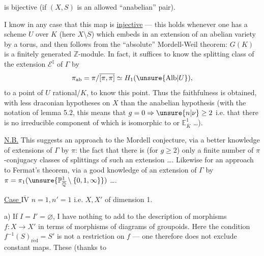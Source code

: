 

is bijective (if $(X,S)$ is an allowed ``anabelian'' pair).

I know in any case that this map is \uline{injective} --- this holds whenever one has a scheme $U$ over $K$ (here $X\setminus S$) which embeds in an  extension of an abelian variety by a torus, and then follows from the ``absolute'' Mordell-Weil theorem: $G(K)$ is a finitely generated $\mathbb Z$-module.
In fact, it suffices to know the splitting class of the extension $\mathcal E^{\natural}$ of $\Gamma$ by
\[
 \pi_{\mathrm{ab}}=\pi/\overline{[\pi,\pi]}\simeq H_1(\unsure{\mathrm{Alb}|U}),
\]
  to a point of $U$ rational/$K$, to know this point. Thus the  faithfulness is obtained, with less draconian hypotheses on $X$ than the anabelian hypothesis (with the notation of lemma 5.2, this means that $g=0\Rightarrow\unsure{n|\nu}\ge2$ i.e. that there is no irreducible component of  which is isomorphic to  or $\mathbb E^1_{\overline K}$ \ldots).



\uline{N.B.} This suggests an approach to the Mordell conjecture, via a better knowledge of extensions of $\Gamma$ by $\pi$: the fact that there is (for $g\ge2$) only a finite number of $\pi$-conjugacy classes of splittings of such an extension \ldots.
Likewise for an approach to Fermat's theorem, via  a good knowledge of an extension of $\Gamma$ by $\pi=\pi_1(\unsure{\mathbb P^1_{\overline{\mathbb Q}}\setminus\{0,1,\infty\}})$ \ldots.

\uline{Case $\overline{\mathrm{IV}}$} $n=1,n'=1$ i.e. $X,X'$ of dimension 1.

a) If $I=I'=\varnothing$, I have nothing to add to the description of morphisms $f:X\to X'$ in terms of morphisms of diagrams of groupoids. Here  the condition $f^{-1}(S)_{\mathrm{r\acute ed}}=S'$ is not a restriction on $f$ ---  one therefore does not exclude constant maps. These (thanks to

